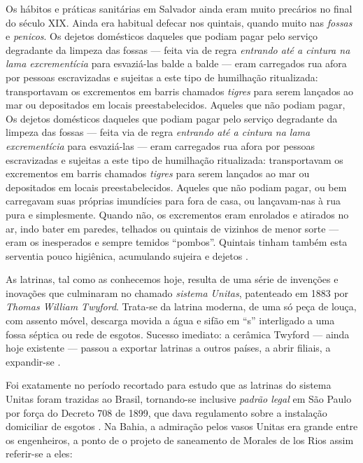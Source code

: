 Os hábitos e práticas sanitárias em Salvador ainda eram muito precários no final do século XIX. Ainda era habitual defecar nos quintais, quando muito nas \textit{fossas} e \textit{penicos}. Os dejetos domésticos daqueles que podiam pagar pelo serviço degradante da limpeza das fossas --- feita via de regra \textit{entrando até a cintura na lama excrementícia} para esvaziá-las balde a balde --- eram carregados rua afora por pessoas escravizadas e sujeitas a este tipo de humilhação ritualizada: transportavam os excrementos em barris chamados \textit{tigres} para serem lançados ao mar ou depositados em locais preestabelecidos. Aqueles que não podiam pagar, Os dejetos domésticos daqueles que podiam pagar pelo serviço degradante da limpeza das fossas --- feita via de regra \textit{entrando até a cintura na lama excrementícia} para esvaziá-las --- eram carregados rua afora por pessoas escravizadas e sujeitas a este tipo de humilhação ritualizada: transportavam os excrementos em barris chamados \textit{tigres} para serem lançados ao mar ou depositados em locais preestabelecidos. Aqueles que não podiam pagar, ou bem carregavam suas próprias imundícies para fora de casa, ou lançavam-nas à rua pura e simplesmente. Quando não, os excrementos eram enrolados e atirados no ar, indo bater em paredes, telhados ou quintais de vizinhos de menor sorte --- eram os inesperados e sempre temidos ``pombos''. Quintais tinham também esta serventia pouco higiênica, acumulando sujeira e dejetos \cite[p.~113]{SAMPAIO2005}.

As latrinas, tal como as conhecemos hoje, resulta de uma série de invenções e inovações que culminaram no chamado \textit{sistema Unitas}, patenteado em 1883 por \textit{Thomas William Twyford}. Trata-se da latrina moderna, de uma só peça de louça, com assento móvel, descarga movida a água e sifão em ``s'' interligado a uma fossa séptica ou rede de esgotos. Sucesso imediato: a cerâmica Twyford --- ainda hoje existente --- passou a exportar latrinas a outros países, a abrir filiais, a expandir-se \cite{denley_twifords_1982}. 

Foi exatamente no período recortado para estudo que as latrinas do sistema Unitas foram trazidas ao Brasil, tornando-se inclusive \textit{padrão legal} em São Paulo por força do Decreto 708 de 1899, que dava regulamento sobre a instalação domiciliar de esgotos \cite[p.~276]{paulillo_corcasacid_2017}. Na Bahia, a admiração pelos vasos Unitas era grande entre os engenheiros, a ponto de o projeto de saneamento de Morales de los Rios assim referir-se a eles:

